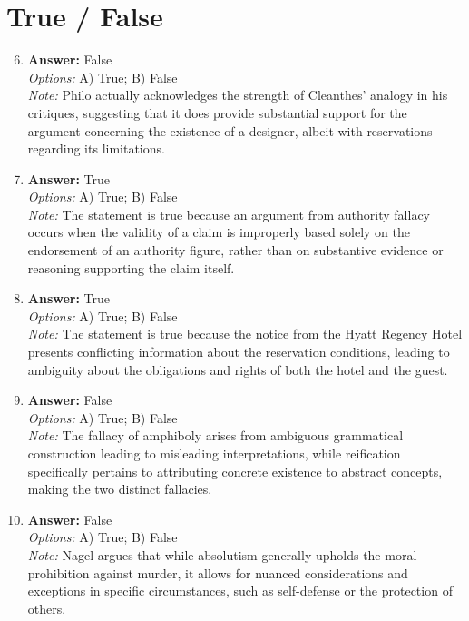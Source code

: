 \documentclass[12pt]{article}
\begin{document}
\section*{True / False}
\begin{enumerate}[label=\arabic*.]
\setcounter{enumi}{5}
\item \textbf{Answer:} False
\\ \textit{Options:} A) True; B) False
\\ \textit{Note:} Philo actually acknowledges the strength of Cleanthes' analogy in his critiques, suggesting that it does provide substantial support for the argument concerning the existence of a designer, albeit with reservations regarding its limitations.
\item \textbf{Answer:} True
\\ \textit{Options:} A) True; B) False
\\ \textit{Note:} The statement is true because an argument from authority fallacy occurs when the validity of a claim is improperly based solely on the endorsement of an authority figure, rather than on substantive evidence or reasoning supporting the claim itself.
\item \textbf{Answer:} True
\\ \textit{Options:} A) True; B) False
\\ \textit{Note:} The statement is true because the notice from the Hyatt Regency Hotel presents conflicting information about the reservation conditions, leading to ambiguity about the obligations and rights of both the hotel and the guest.
\item \textbf{Answer:} False
\\ \textit{Options:} A) True; B) False
\\ \textit{Note:} The fallacy of amphiboly arises from ambiguous grammatical construction leading to misleading interpretations, while reification specifically pertains to attributing concrete existence to abstract concepts, making the two distinct fallacies.
\item \textbf{Answer:} False
\\ \textit{Options:} A) True; B) False
\\ \textit{Note:} Nagel argues that while absolutism generally upholds the moral prohibition against murder, it allows for nuanced considerations and exceptions in specific circumstances, such as self-defense or the protection of others.
\end{enumerate}
\end{document}
